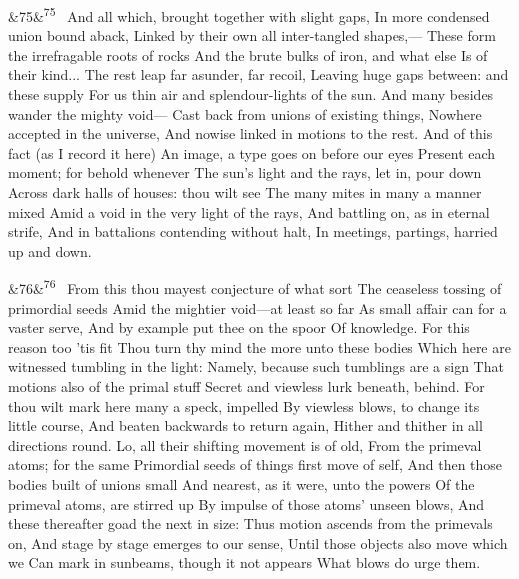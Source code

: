\documentclass[12pt]{article}
\newcommand{\para}[1][]{\par\noindent\ifx&#1&\else\textsuperscript{\footnotesize #1}~\fi}
\begin{document}
\para[75] And all which, brought together with slight gaps, In more condensed union bound aback, Linked by their own all inter-tangled shapes,--- These form the irrefragable roots of rocks And the brute bulks of iron, and what else Is of their kind... The rest leap far asunder, far recoil, Leaving huge gaps between: and these supply For us thin air and splendour-lights of the sun. And many besides wander the mighty void--- Cast back from unions of existing things, Nowhere accepted in the universe, And nowise linked in motions to the rest. And of this fact (as I record it here) An image, a type goes on before our eyes Present each moment; for behold whenever The sun's light and the rays, let in, pour down Across dark halls of houses: thou wilt see The many mites in many a manner mixed Amid a void in the very light of the rays, And battling on, as in eternal strife, And in battalions contending without halt, In meetings, partings, harried up and down.

\para[76] From this thou mayest conjecture of what sort The ceaseless tossing of primordial seeds Amid the mightier void---at least so far As small affair can for a vaster serve, And by example put thee on the spoor Of knowledge. For this reason too 'tis fit Thou turn thy mind the more unto these bodies Which here are witnessed tumbling in the light: Namely, because such tumblings are a sign That motions also of the primal stuff Secret and viewless lurk beneath, behind. For thou wilt mark here many a speck, impelled By viewless blows, to change its little course, And beaten backwards to return again, Hither and thither in all directions round. Lo, all their shifting movement is of old, From the primeval atoms; for the same Primordial seeds of things first move of self, And then those bodies built of unions small And nearest, as it were, unto the powers Of the primeval atoms, are stirred up By impulse of those atoms' unseen blows, And these thereafter goad the next in size: Thus motion ascends from the primevals on, And stage by stage emerges to our sense, Until those objects also move which we Can mark in sunbeams, though it not appears What blows do urge them.
\end{document}
